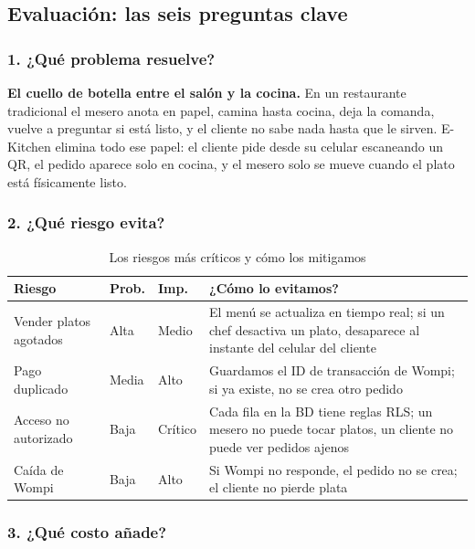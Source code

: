 \documentclass[12pt,a4paper]{article}
\begin{document}
\subsection{Evaluación: las seis preguntas clave}

\subsubsection{1. ¿Qué problema resuelve?}

\textbf{El cuello de botella entre el salón y la cocina.} En un restaurante tradicional el mesero anota en papel, camina hasta cocina, deja la comanda, vuelve a preguntar si está listo, y el cliente no sabe nada hasta que le sirven. E-Kitchen elimina todo ese papel: el cliente pide desde su celular escaneando un QR, el pedido aparece solo en cocina, y el mesero solo se mueve cuando el plato está físicamente listo.

\subsubsection{2. ¿Qué riesgo evita?}

\begin{table}[H]
\centering
{}
\small
\begin{tabular}{p{3.2cm} p{1.2cm} p{1.2cm} p{6cm}}
\toprule
\rowcolor{thomas!20}\textbf{Riesgo} & \textbf{Prob.} & \textbf{Imp.} & \textbf{¿Cómo lo evitamos?} \\
\midrule
Vender platos agotados & Alta & Medio & El menú se actualiza en tiempo real; si un chef desactiva un plato, desaparece al instante del celular del cliente \\
Pago duplicado & Media & Alto & Guardamos el ID de transacción de Wompi; si ya existe, no se crea otro pedido \\
Acceso no autorizado & Baja & Crítico & Cada fila en la BD tiene reglas RLS; un mesero no puede tocar platos, un cliente no puede ver pedidos ajenos \\
Caída de Wompi & Baja & Alto & Si Wompi no responde, el pedido no se crea; el cliente no pierde plata \\
\bottomrule
\end{tabular}
\caption{Los riesgos más críticos y cómo los mitigamos}
\end{table}

\subsubsection{3. ¿Qué costo añade?}
\end{document}
